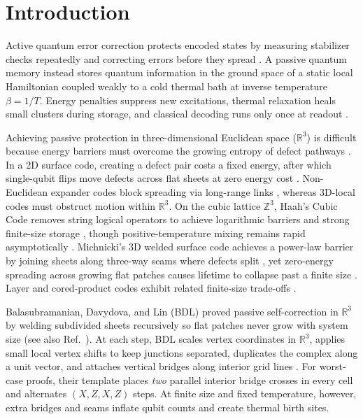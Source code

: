 \documentclass[aps,prx,reprint,superscriptaddress,nofootinbib,floatfix]{revtex4-2}
\begin{document}
\maketitle

\section{Introduction}
\label{sec:intro}

Active quantum error correction protects encoded states by measuring stabilizer checks repeatedly and correcting errors before they spread \cite{bravyi_bb2024}. A passive quantum memory instead stores quantum information in the ground space of a static local Hamiltonian coupled weakly to a cold thermal bath at inverse temperature $\beta = 1/T$. Energy penalties suppress new excitations, thermal relaxation heals small clusters during storage, and classical decoding runs only once at readout \cite{quantumMemories, selfcorrecting4D, alicki4D}.

Achieving passive protection in three-dimensional Euclidean space ($\mathbb{R}^3$) is difficult because energy barriers must overcome the growing entropy of defect pathways \cite{chesi2010, siva2017, bergamaschi2025mixing}. In a 2D surface code, creating a defect pair costs a fixed energy, after which single-qubit flips move defects across flat sheets at zero energy cost \cite{selfcorrecting2D}. Non-Euclidean expander codes block spreading via long-range links \cite{bravyi_bb2024, hong2025trivial, guo2026neutral}, whereas 3D-local codes must obstruct motion within $\mathbb{R}^3$. On the cubic lattice $\mathbb{Z}^3$, Haah's Cubic Code removes string logical operators to achieve logarithmic barriers and strong finite-size storage \cite{haah2011cubic, yoshida2011, bravyi_haah2013}, though positive-temperature mixing remains rapid asymptotically \cite{stengele2026haah}. Michnicki's 3D welded surface code achieves a power-law barrier by joining sheets along three-way seams where defects split \cite{michnicki2014}, yet zero-energy spreading across growing flat patches causes lifetime to collapse past a finite size \cite{siva2017}. Layer and cored-product codes exhibit related finite-size trade-offs \cite{layercodesydney, layercodesyale, williamson2026layer, roberts2026cored}.

Balasubramanian, Davydova, and Lin (BDL) \cite{selfcorrecting3D} proved passive self-correction in $\mathbb{R}^3$ by welding subdivided sheets recursively so flat patches never grow with system size (see also Ref.~\cite{hayden2026}). At each step, BDL scales vertex coordinates in $\mathbb{R}^3$, applies small local vertex shifts to keep junctions separated, duplicates the complex along a unit vector, and attaches vertical bridges along interior grid lines \cite{selfcorrecting3D}. For worst-case proofs, their template places \emph{two} parallel interior bridge crosses in every cell and alternates $(X, Z, X, Z)$ steps. At finite size and fixed temperature, however, extra bridges and seams inflate qubit counts and create thermal birth sites.
\end{document}
